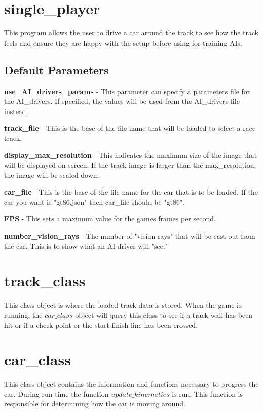 \documentclass[12pt]{article}
\begin{document}
\section{single\_player}

This program allows the user to drive a car around the track to see how the track feels and ensure they are happy with the setup before using for training AIs.

\subsection{Default Parameters}
\indent\indent\textbf{use\_AI\_drivers\_params} - This parameter can specify a parameters file for the AI\_drivers. If specified, the values will be used from the AI\_drivers file instead.

\indent\textbf{track\_file} - This is the base of the file name that will be loaded to select a race track.

\indent\textbf{display\_max\_resolution} - This indicates the maximum size of the image that will be displayed on screen. If the track image is larger than the max\_resolution, the image will be scaled down.

\indent\textbf{car\_file} - This is the base of the file name for the car that is to be loaded. If the car you want is "gt86.json" then car\_file should be "gt86".

\indent\textbf{FPS} - This sets a maximum value for the games frames per second.

\indent\textbf{number\_vision\_rays} - The number of "vision rays" that will be cast out from the car. This is to show what an AI driver will "see."



\section{track\_class}

This class object is where the loaded track data is stored. When the game is running, the $car\_class$ object will query this class to see if a track wall has been hit or if a check point or the start-finish line has been crossed.




\section{car\_class}

This class object contains the information and functions necessary to progress the car. During run time the function $update\_kinematics$ is run. This function is responsible for determining how the car is moving around.
\end{document}
